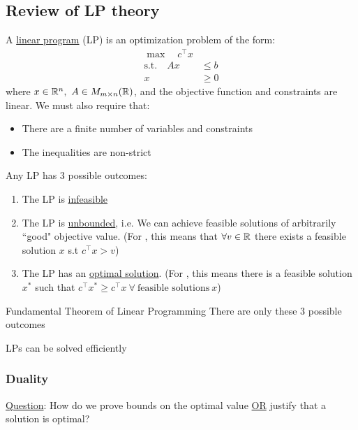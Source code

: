\subsection{Review of LP theory}
A \underline{linear program} (LP) is an optimization problem of the form:
\begin{equation}\label{eq:intro-review-lp}
\begin{aligned}
    \max \quad c^\intercal x & \\
    \text{s.t.} \quad Ax &\leq b \\
    x &\geq 0
\end{aligned}
\end{equation}
where $x \in \mathbb{R}^n, \ A \in M_{m \times n}(\mathbb{R}) $, and the objective function and constraints are linear. We must also require that:
\begin{itemize}
    \item There are a finite number of variables and constraints
    \item The inequalities are non-strict
\end{itemize}

Any LP has 3 possible outcomes:
\begin{enumerate}
    \item The LP is \underline{infeasible}
    \item The LP is \underline{unbounded}, i.e. We can achieve feasible solutions of arbitrarily ``good" objective value. (For , this means that $\forall v \in \mathbb{R}$ there exists a feasible solution $x$ s.t $c^\intercal x > v$)
    \item The LP has an \underline{optimal solution}. (For , this means there is a feasible solution $x^*$ such that $c^\intercal x^* \geq c^\intercal x \ \forall \ \text{feasible solutions} \ x$)
\end{enumerate}

\begin{theorem}{Fundamental Theorem of Linear Programming}{}
    There are only these $3$ possible outcomes
\end{theorem}

\begin{theorem}{}{}
    LPs can be solved efficiently
\end{theorem}

\subsubsection{Duality}
\underline{Question}: How do we prove bounds on the optimal value \underline{OR} justify that a solution is optimal?

